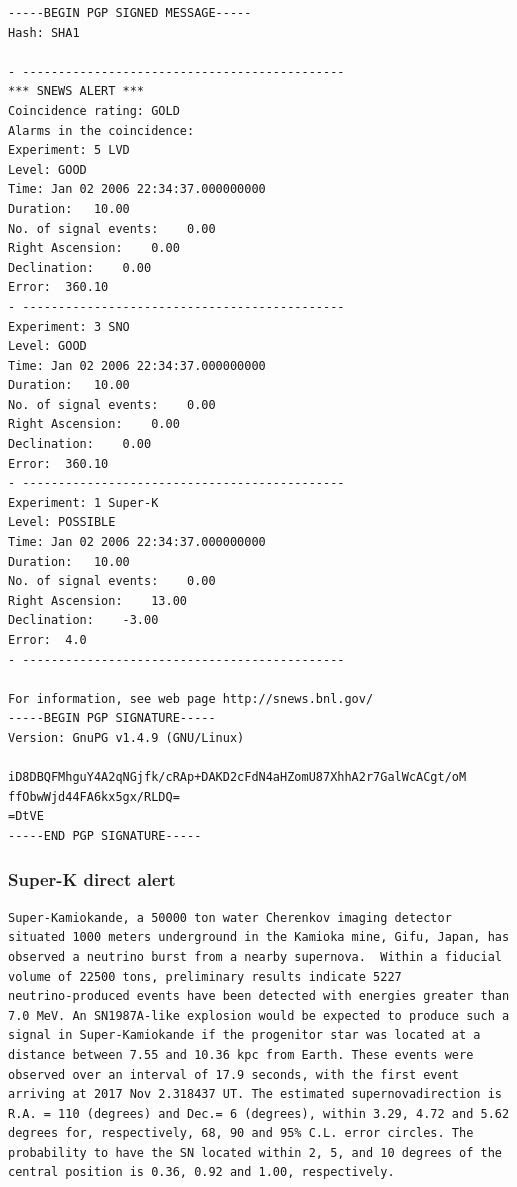 \documentclass[11pt]{article}
\newcommand{\superk}  {Super\nobreakdash-K\xspace}
\begin{document}

\begin{verbatim}
-----BEGIN PGP SIGNED MESSAGE-----
Hash: SHA1

- ---------------------------------------------
*** SNEWS ALERT ***
Coincidence rating: GOLD
Alarms in the coincidence:
Experiment: 5 LVD
Level: GOOD
Time: Jan 02 2006 22:34:37.000000000
Duration:   10.00
No. of signal events:    0.00
Right Ascension:    0.00
Declination:    0.00
Error:  360.10
- ---------------------------------------------
Experiment: 3 SNO
Level: GOOD 
Time: Jan 02 2006 22:34:37.000000000
Duration:   10.00
No. of signal events:    0.00
Right Ascension:    0.00
Declination:    0.00
Error:  360.10
- ---------------------------------------------
Experiment: 1 Super-K
Level: POSSIBLE 
Time: Jan 02 2006 22:34:37.000000000
Duration:   10.00
No. of signal events:    0.00
Right Ascension:    13.00
Declination:    -3.00
Error:  4.0
- ---------------------------------------------

For information, see web page http://snews.bnl.gov/
-----BEGIN PGP SIGNATURE-----
Version: GnuPG v1.4.9 (GNU/Linux)

iD8DBQFMhguY4A2qNGjfk/cRAp+DAKD2cFdN4aHZomU87XhhA2r7GalWcACgt/oM
ffObwWjd44FA6kx5gx/RLDQ=
=DtVE
-----END PGP SIGNATURE-----
\end{verbatim}


\subsubsection{\superk direct alert}

\begin{verbatim}
Super-Kamiokande, a 50000 ton water Cherenkov imaging detector
situated 1000 meters underground in the Kamioka mine, Gifu, Japan, has
observed a neutrino burst from a nearby supernova.  Within a fiducial
volume of 22500 tons, preliminary results indicate 5227
neutrino-produced events have been detected with energies greater than
7.0 MeV. An SN1987A-like explosion would be expected to produce such a
signal in Super-Kamiokande if the progenitor star was located at a
distance between 7.55 and 10.36 kpc from Earth. These events were
observed over an interval of 17.9 seconds, with the first event
arriving at 2017 Nov 2.318437 UT. The estimated supernovadirection is
R.A. = 110 (degrees) and Dec.= 6 (degrees), within 3.29, 4.72 and 5.62
degrees for, respectively, 68, 90 and 95% C.L. error circles. The
probability to have the SN located within 2, 5, and 10 degrees of the
central position is 0.36, 0.92 and 1.00, respectively.
\end{verbatim}
\end{document}
